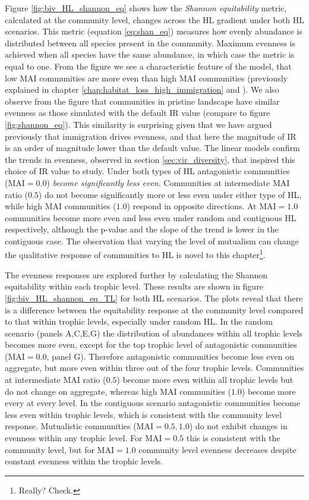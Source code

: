 Figure \ref{fig:biv_HL_shannon_eq} shows how the \emph{Shannon equitability} metric, calculated at the community level, changes across the HL gradient under both HL scenarios. This metric (equation \eqref{eq:shan_eq}) measures how evenly abundance is distributed between all species present in the community. Maximum evenness is achieved when all species have the same abundance, in which case the metric is equal to one. From the figure we see a characteristic feature of the model, that low MAI communities are more even than high MAI communities (previously explained in chapter \ref{chap:habitat_loss_high_immigration} and \cite{lurgi2015effects}). We also observe from the figure that communities in pristine landscape have similar evenness as those simulated with the default IR value (compare to figure \ref{fig:shannon_eq}). This similarity is surprising given that we have argued previously that immigration drives evenness, and that here the magnitude of IR is an order of magnitude lower than the default value. The linear models confirm the trends in evenness, observed in section \ref{sec:vir_diversity}, that inspired this choice of IR value to study. Under both types of HL antagonistic communities (MAI$=0.0$) \emph{become significantly less even}. Communities at intermediate MAI ratio ($0.5$) do not become significantly more or less even under either type of HL, while high MAI communities ($1.0$) respond in opposite directions. At MAI$=1.0$ communities become more even and less even under random and contiguous HL respectively, although the p-value and the slope of the trend is lower in the contiguous case. The observation that varying the level of mutualism can change the qualitative response of communities to HL is novel to this chapter\footnote{Really? Check.}.


The evenness responses are explored further by calculating the Shannon equitability within each trophic level. These results are shown in figure \ref{fig:biv_HL_shannon_eq_TL} for both HL scenarios. The plots reveal that there is a difference between the  equitability response at the community level compared to that within trophic levels, especially under random HL. In the random scenario (panels A,C,E,G) the distribution of abundances within all trophic levels becomes more even, except for the top trophic level of antagonistic communities (MAI$=0.0$, panel G). Therefore antagonistic communities become less even on aggregate, but more even within three out of the four trophic levels. Communities at intermediate MAI ratio ($0.5$) become more even within all trophic levels but do not change on aggregate, whereas high MAI communities ($1.0$) become more every at every level. In the contiguous scenario antagonistic communities  become less even within trophic levels, which is consistent with the community level response. Mutualistic communities (MAI$=0.5,1.0$) do not exhibit changes in evenness within any trophic level. For MAI$=0.5$ this is consistent with the community level, but for MAI$=1.0$ community level evenness decreases despite constant evenness within the trophic levels.   



